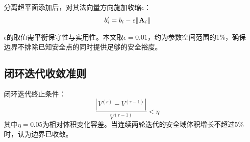 分离超平面添加后，对其法向量方向施加收缩$\epsilon$：
\begin{equation}
    b_i' = b_i - \epsilon \|\mathbf{A}_i\|
    \label{eq:shrinkage}
\end{equation}

$\epsilon$的取值需平衡保守性与实用性。本文取$\epsilon = 0.01$，约为参数空间范围的1\%，确保边界不排除已知安全点的同时提供足够的安全裕度。

\subsection{闭环迭代收敛准则}

闭环迭代终止条件：
\begin{equation}
    \frac{|V^{(r)} - V^{(r-1)}|}{V^{(r-1)}} < \eta
    \label{eq:terminate}
\end{equation}
其中$\eta = 0.05$为相对体积变化容差。当连续两轮迭代的安全域体积增长不超过5\%时，认为边界已收敛。
